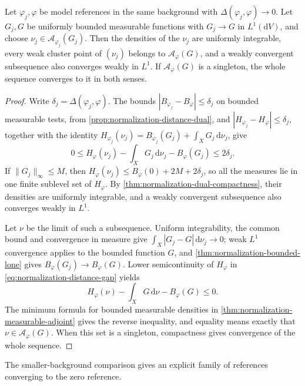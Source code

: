 \begin{proposition}\label{prop:normalization-distance-stability}\label{eq:geometric-adjoint-gap}
Let $\varphi_j,\varphi$ be model references in the same background with $\Delta(\varphi_j,\varphi)\to0$. Let $G_j,G$ be uniformly bounded measurable functions with $G_j\to G$ in $L^1(\mathrm{d}V)$, and choose $\nu_j\in\mathcal A_{\varphi_j}(G_j)$. Then the densities of the $\nu_j$ are uniformly integrable, every weak cluster point of $(\nu_j)$ belongs to $\mathcal A_\varphi(G)$, and a weakly convergent subsequence also converges weakly in $L^1$. If $\mathcal A_\varphi(G)$ is a singleton, the whole sequence converges to it in both senses.
\end{proposition}
\begin{proof}
Write $\delta_j=\Delta(\varphi_j,\varphi)$. The bounds $|B_{\varphi_j}-B_\varphi|\leq\delta_j$ on bounded measurable tests, from \cref{prop:normalization-distance-dual}, and $|H_{\varphi_j}-H_\varphi|\leq\delta_j$, together with the identity $H_{\varphi_j}(\nu_j)=B_{\varphi_j}(G_j)+\int_XG_j\,\mathrm{d}\nu_j$, give
\begin{equation}\label{eq:normalization-distance-gap}
 0\leq H_\varphi(\nu_j)-\int_XG_j\,\mathrm{d}\nu_j-B_\varphi(G_j)
       \leq2\delta_j.
\end{equation}
If $\|G_j\|_\infty\leq M$, then $H_\varphi(\nu_j)\leq B_\varphi(0)+2M+2\delta_j$, so all the measures lie in one finite sublevel set of $H_\varphi$. By \cref{thm:normalization-dual-compactness}, their densities are uniformly integrable, and a weakly convergent subsequence also converges weakly in $L^1$.

Let $\nu$ be the limit of such a subsequence. Uniform integrability, the common bound and convergence in measure give $\int_X|G_j-G|\,\mathrm{d}\nu_j\to0$; weak $L^1$ convergence applies to the bounded function $G$, and \cref{thm:normalization-bounded-lone} gives $B_\varphi(G_j)\to B_\varphi(G)$. Lower semicontinuity of $H_\varphi$ in \eqref{eq:normalization-distance-gap} yields
\[
 H_\varphi(\nu)-\int_XG\,\mathrm{d}\nu-B_\varphi(G)\leq0.
\]
The minimum formula for bounded measurable densities in \cref{thm:normalization-measurable-adjoint} gives the reverse inequality, and equality means exactly that $\nu\in\mathcal A_\varphi(G)$. When this set is a singleton, compactness gives convergence of the whole sequence.
\end{proof}

The smaller-background comparison gives an explicit family of references converging to the zero reference.
